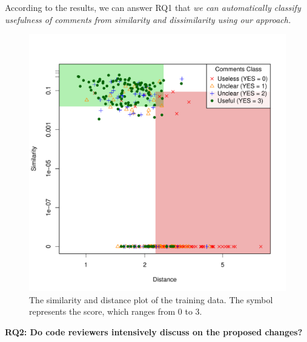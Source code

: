 \documentclass[conference]{IEEEtran}
\begin{document}
According to the results, we can answer  RQ1 that \textit{we can automatically classify usefulness of comments from similarity and dissimilarity using our approach.}



\begin{figure}[!t]
\centering
\includegraphics[scale=0.45, trim=0 0 30 50, clip=true]{scatter_log}
\caption{The similarity and distance plot of the training data.
The symbol represents the score, which ranges from 0 to 3.}
\label{fig:scatter}
\end{figure}

\noindent \textbf{RQ2: Do code reviewers intensively discuss on the proposed changes?}\\
\end{document}
